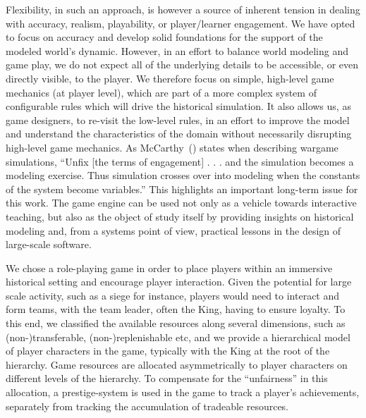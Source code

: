 \documentclass[11pt]{article}
\begin{document}
Flexibility, in such an approach, is however a source of inherent tension in dealing with accuracy, realism,
playability, or player/learner engagement. We have opted to focus on accuracy and develop solid foundations
for the support of the modeled world’s dynamic. However, in an effort to balance world modeling and game play,
we do not expect all of the underlying details to be accessible, or even directly visible, to the player. We
therefore focus on simple, high-level game mechanics (at player level), which are part of a more complex system
of configurable rules which will drive the historical simulation. It also allows us, as game designers, to
re-visit the low-level rules, in an effort to improve the model and understand the characteristics of the
domain without necessarily disrupting high-level game mechanics. As McCarthy~(\cite*{McCarthy}) states when describing
wargame simulations, ``Unfix [the terms of engagement] . . . and the simulation becomes a modeling
exercise. Thus simulation crosses over into modeling when the constants of the system become variables.'' This
highlights an important long-term issue for this work. The game engine can be used not only as a vehicle
towards interactive teaching, but also as the object of study itself by providing insights on historical
modeling and, from a systems point of view, practical lessons in the design of large-scale software.


We chose a role-playing game in order to place players within an immersive historical setting and encourage
player interaction. Given the potential for large scale activity, such as a siege for instance, players would
need to interact and form teams, with the team leader, often the King, having to ensure loyalty. To this end,
we classified the available resources along several dimensions, such as (non-)transferable,
(non-)replenishable etc, and we provide a hierarchical model of player characters in the game, typically with
the King at the root of the hierarchy. Game resources are allocated asymmetrically to player characters on
different levels of the hierarchy. To compensate for the ``unfairness'' in this allocation, a prestige-system is
used in the game to track a player’s achievements, separately from tracking the accumulation of tradeable
resources.
\end{document}
